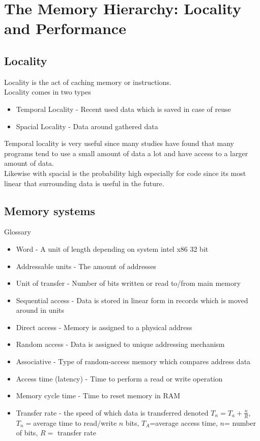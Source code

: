 \documentclass[12pt, a4paper]{article}
\begin{document}
	\section{The Memory Hierarchy: Locality and Performance}
		\subsection{Locality}
			Locality is the act of caching memory or instructions.\\
			Locality comes in two types
			\begin{itemize}
				\item Temporal Locality  - Recent used data which is saved in case of reuse
				\item Spacial Locality - Data around gathered data
			\end{itemize}
			Temporal locality is very useful since many studies have found that many programs tend to use a small amount of data a lot and have access to a larger amount of data.\\
			Likewise with spacial is the probability high especially for code since its most linear that surrounding data is useful in the future.
		\subsection{Memory systems}
			Glossary
			\begin{itemize}
				\item Word - A unit of length depending on system intel x86 32 bit
				\item Addressable units - The amount of addresses
				\item Unit of transfer - Number of bits written or read to/from main memory
				\item Sequential access - Data is stored in linear form in records which is moved around in units
				\item Direct access - Memory is assigned to a physical address
				\item Random access -  Data is assigned to unique addressing mechanism
				\item Associative - Type of random-access memory which compares address data
				\item Access time (latency) - Time to perform a read or write operation
				\item Memory cycle time - Time to reset memory in RAM
				\item Transfer rate - the speed of which data is transferred denoted $T_n=T_a+\frac{n}{R}$, $T_n=$average time to read/write $n$ bits, $T_A$=average access time, $n$= number of bits, $R=$ transfer rate
			\end{itemize}
\end{document}
